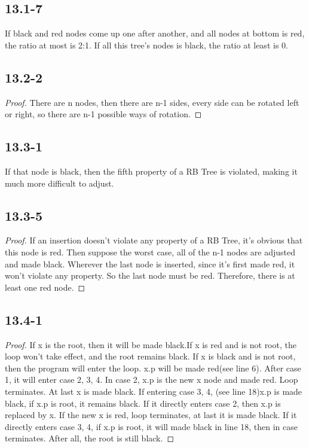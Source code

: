 \documentclass[twocolumn]{article}
\begin{document}
	\subsection*{13.1-7}
	If black and red nodes come up one after another, and all nodes at bottom is red, the ratio at most is 2:1. If all this tree's nodes is black, the ratio at least is 0.
	\subsection*{13.2-2}
	\begin{proof}
		There are n nodes, then there are n-1 sides, every side can be rotated left or right, so there are n-1 possible ways of rotation.
	\end{proof}
	\subsection*{13.3-1}
	If that node is black, then the fifth property of a RB Tree is violated, making it much more difficult to adjust.
	\subsection*{13.3-5}
	\begin{proof}
		If an insertion doesn't violate any property of a RB Tree, it's obvious that this node is red. Then suppose the worst case, all of the n-1 nodes are adjusted and made black. Wherever the last node is inserted, since it's first made red, it won't violate any property. So the last node must be red. Therefore, there is at least one red node.
	\end{proof}
	\subsection*{13.4-1}
	\begin{proof}
		If x is the root, then it will be made black.If x is red and is not root, the loop won't take effect, and the root remains black. If x is black and is not root, then the program will enter the loop. x.p will be made red(see line 6). After case 1, it will enter case 2, 3, 4. In case 2, x.p is the new x node and made red. Loop terminates. At last x is made black. If entering case 3, 4, (see line 18)x.p is made black, if x.p is root, it remains black. If it directly enters case 2, then x.p is replaced by x. If the new x is red, loop terminates, at last it is made black. If it directly enters case 3, 4, if x.p is root, it will made black in line 18, then in case terminates. After all, the root is still black.
	\end{proof}
\end{document}
